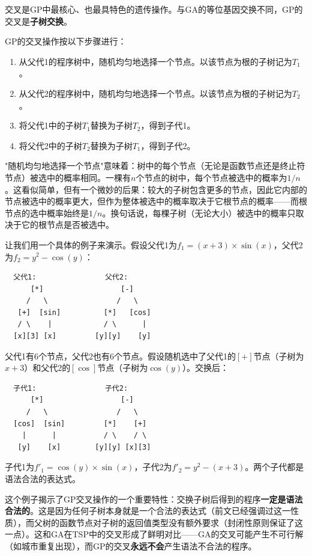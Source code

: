\documentclass[lang=cn,zihao=-4,a4paper,fontset=windows]{beautybook}
\begin{document}
交叉是GP中最核心、也最具特色的遗传操作。与GA的等位基因交换不同，GP的交叉是\textbf{子树交换}。

\begin{definition}[][子树交叉]
GP的交叉操作按以下步骤进行：
\begin{enumerate}
    \item 从父代1的程序树中，随机均匀地选择一个节点。以该节点为根的子树记为$T_1$。
    \item 从父代2的程序树中，随机均匀地选择一个节点。以该节点为根的子树记为$T_2$。
    \item 将父代1中的子树$T_1$替换为子树$T_2$，得到子代1。
    \item 将父代2中的子树$T_2$替换为子树$T_1$，得到子代2。
\end{enumerate}
\end{definition}

"随机均匀地选择一个节点"意味着：树中的每个节点（无论是函数节点还是终止符节点）被选中的概率相同。一棵有$n$个节点的树中，每个节点被选中的概率为$1/n$。这看似简单，但有一个微妙的后果：较大的子树包含更多的节点，因此它内部的节点被选中的概率更大，但作为整体被选中的概率取决于它根节点的概率——而根节点的选中概率始终是$1/n$。换句话说，每棵子树（无论大小）被选中的概率只取决于它的根节点是否被选中。

让我们用一个具体的例子来演示。假设父代1为$f_1 = (x + 3) \times \sin(x)$，父代2为$f_2 = y^2 - \cos(y)$：

\begin{verbatim}
  父代1:                父代2:
      [*]                  [-]
     /   \                /   \
   [+]  [sin]          [*]   [cos]
   / \    |            / \      |
  [x][3] [x]         [y][y]    [y]
\end{verbatim}

父代1有6个节点，父代2也有6个节点。假设随机选中了父代1的$[+]$节点（子树为$x+3$）和父代2的$[\cos]$节点（子树为$\cos(y)$）。交换后：

\begin{verbatim}
  子代1:                子代2:
      [*]                  [-]
     /   \                /   \
  [cos]  [sin]         [*]    [+]
    |      |           / \    / \
   [y]    [x]        [y][y] [x][3]
\end{verbatim}

子代1为$f'_1 = \cos(y) \times \sin(x)$，子代2为$f'_2 = y^2 - (x + 3)$。两个子代都是语法合法的表达式。

这个例子揭示了GP交叉操作的一个重要特性：交换子树后得到的程序\textbf{一定是语法合法的}。这是因为任何子树本身就是一个合法的表达式（前文已经强调过这一性质），而父树的函数节点对子树的返回值类型没有额外要求（封闭性原则保证了这一点）。这和GA在TSP中的交叉形成了鲜明对比——GA的交叉可能产生不可行解（如城市重复出现），而GP的交叉\textbf{永远不会}产生语法不合法的程序。
\end{document}
